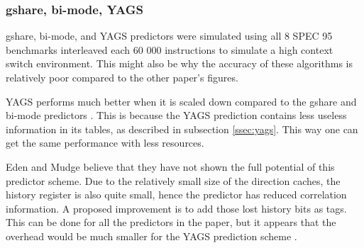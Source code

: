 \subsubsection*{gshare, bi-mode, YAGS}
gshare, bi-mode, and YAGS predictors were simulated using all 8 SPEC 95 benchmarks interleaved each 60 000 instructions to simulate a high context switch environment. 
This might also be why the accuracy of these algorithms is relatively poor compared to the other paper's figures.

YAGS performs much better when it is scaled down compared to the gshare and bi-mode predictors \cite{yags}.
This is because the YAGS prediction contains less useless information in its tables, as described in subsection \ref{ssec:yags}.
This way one can get the same performance with less resources.

Eden and Mudge believe that they have not shown the full potential of this predictor scheme.
Due to the relatively small size of the direction caches, the history register is also quite small, hence the predictor has reduced correlation information.
A proposed improvement is to add those lost history bits as tags.
This can be done for all the predictors in the paper, but it appears that the overhead would be much smaller for the YAGS prediction scheme \cite{yags}. 
